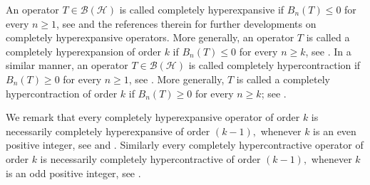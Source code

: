 \documentclass[10pt,oneside,reqno]{amsart}
\theoremstyle{definition}
\theoremstyle{remark}
\numberwithin{equation}{section}
\begin{document}
 An operator $T \in \mathcal{B}(\mathcal{H})$  is called completely hyperexpansive if $B_n(T) \leqslant 0$ for every $n \geqslant 1$,  see \cite{Atha95,1993multiplication,Athvale2000,Jablonski2002} and the references therein for further developments on completely hyperexpansive operators. More generally, an operator \(T\) is called a completely hyperexpansion of order \(k\) if \(B_n(T)\leqslant 0\) for every \(n \geqslant k\), see \cite[Sec. 3]{CS17}. In a similar manner, an operator \(T \in \mathcal{B}(\mathcal{H})\) is called completely hypercontraction if \(B_n(T) \geqslant 0\) for every \(n \geqslant 1\), see \cite{Aglerhyperc}. More generally, \(T\) is called a completely hypercontraction of order \(k\) if \(B_n(T) \geqslant 0\) for every \(n \geqslant k\); see \cite[Sec. 4]{CMF}. 

 We remark that every completely hyperexpansive operator of order $k$ is necessarily completely hyperexpansive of order $(k-1),$ whenever $k$ is an even positive integer, see  \cite[Lemma 3.13]{CS17} and \cite[Theorem 2.5]{2015Gu}. Similarly every completely hypercontractive operator of order $k$ is necessarily completely hypercontractive of order $(k-1),$ whenever $k$ is an odd positive integer, see \cite[Theorem 2.5]{2015Gu}. 
\end{document}
